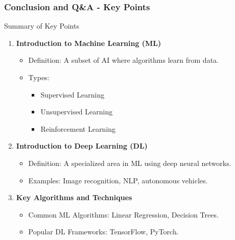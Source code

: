 \documentclass[aspectratio=169]{beamer}
\begin{document}
\begin{frame}[fragile]
    \frametitle{Conclusion and Q\&A - Key Points}
    \begin{block}{Summary of Key Points}
        \begin{enumerate}
            \item \textbf{Introduction to Machine Learning (ML)}
            \begin{itemize}
                \item Definition: A subset of AI where algorithms learn from data.
                \item Types:
                \begin{itemize}
                    \item Supervised Learning
                    \item Unsupervised Learning
                    \item Reinforcement Learning
                \end{itemize}
            \end{itemize}

            \item \textbf{Introduction to Deep Learning (DL)}
            \begin{itemize}
                \item Definition: A specialized area in ML using deep neural networks.
                \item Examples: Image recognition, NLP, autonomous vehicles.
            \end{itemize}

            \item \textbf{Key Algorithms and Techniques}
            \begin{itemize}
                \item Common ML Algorithms: Linear Regression, Decision Trees.
                \item Popular DL Frameworks: TensorFlow, PyTorch.
            \end{itemize}
        \end{enumerate}
    \end{block}
\end{frame}
\end{document}
